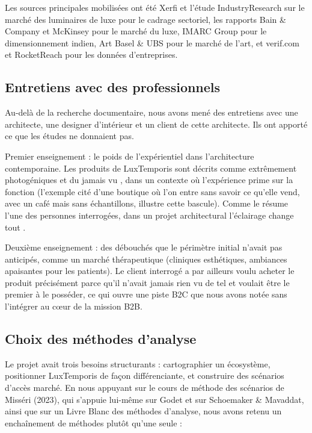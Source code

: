 \documentclass[11pt,a4paper]{article}
\begin{document}
Les sources principales mobilisées ont été Xerfi et l'étude IndustryResearch sur le marché des luminaires de luxe pour le cadrage sectoriel, les rapports Bain \& Company et McKinsey pour le marché du luxe, IMARC Group pour le dimensionnement indien, Art Basel \& UBS pour le marché de l'art, et verif.com et RocketReach pour les données d'entreprises.

\subsection{Entretiens avec des professionnels}

Au-delà de la recherche documentaire, nous avons mené des entretiens avec une architecte, une designer d'intérieur et un client de cette architecte. Ils ont apporté ce que les études ne donnaient pas.

Premier enseignement : le poids de l'expérientiel dans l'architecture contemporaine. Les produits de LuxTemporis sont décrits comme extrêmement photogéniques et \og du jamais vu \fg{}, dans un contexte où l'expérience prime sur la fonction (l'exemple cité d'une boutique où l'on entre sans savoir ce qu'elle vend, avec un café mais sans échantillons, illustre cette bascule). Comme le résume l'une des personnes interrogées, dans un projet architectural \og l'éclairage change tout \fg{}.

Deuxième enseignement : des débouchés que le périmètre initial n'avait pas anticipés, comme un marché thérapeutique (cliniques esthétiques, ambiances apaisantes pour les patients). Le client interrogé a par ailleurs voulu acheter le produit précisément parce qu'il n'avait jamais rien vu de tel et voulait être le premier à le posséder, ce qui ouvre une piste B2C que nous avons notée sans l'intégrer au c\oe ur de la mission B2B.

\subsection{Choix des méthodes d'analyse}

Le projet avait trois besoins structurants : cartographier un écosystème, positionner LuxTemporis de façon différenciante, et construire des scénarios d'accès marché. En nous appuyant sur le cours de méthode des scénarios de Misséri (2023), qui s'appuie lui-même sur Godet et sur Schoemaker \& Mavaddat, ainsi que sur un Livre Blanc des méthodes d'analyse, nous avons retenu un enchaînement de méthodes plutôt qu'une seule :
\end{document}
